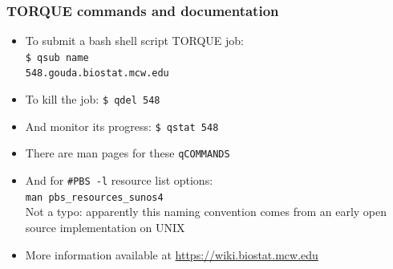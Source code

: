 \documentclass[11pt,pdftex,dvipsnames,usenames,helvetica]{beamer}
\begin{document}
\begin{frame}[fragile] 
\frametitle{TORQUE commands and documentation}
\begin{itemize}
\item To submit a bash shell script TORQUE job:\\ 
{\tt \$ qsub name\\
548.gouda.biostat.mcw.edu}
\item To kill the job: {\tt \$ qdel 548}
\item And monitor its progress: {\tt \$ qstat 548}
\item There are man pages for these {\tt qCOMMANDS}
\item And for {\tt \#PBS -l} resource list options:\\
  {\tt man pbs\_resources\_sunos4}\\
  Not a typo: apparently this naming convention comes from an early
  open source implementation on UNIX
\item More information available at \url{https://wiki.biostat.mcw.edu}
\end{itemize}

\end{frame}
\end{document}
